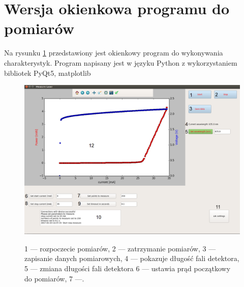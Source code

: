 \section{Wersja okienkowa programu do pomiarów}
Na rysunku \ref{gui_rys} przedstawiony jest okienkowy program do wykonywania charakterystyk. Program napisany jest w języku
Python z wykorzystaniem bibliotek PyQt5, matplotlib
\begin{figure}[h]
\center
  \includegraphics[scale=0.35]{gui.eps}
  \label{gui_rys}
  \caption{1 --- rozpoczecie pomiarów, 2 --- zatrzymanie pomiarów, 3 --- zapisanie danych pomiarowych, 4 --- pokazuje długość fali detektora, 5 --- zmiana długości fali detektora 6 --- ustawia prąd początkowy do pomiarów, 7 ---.}
\end{figure}

